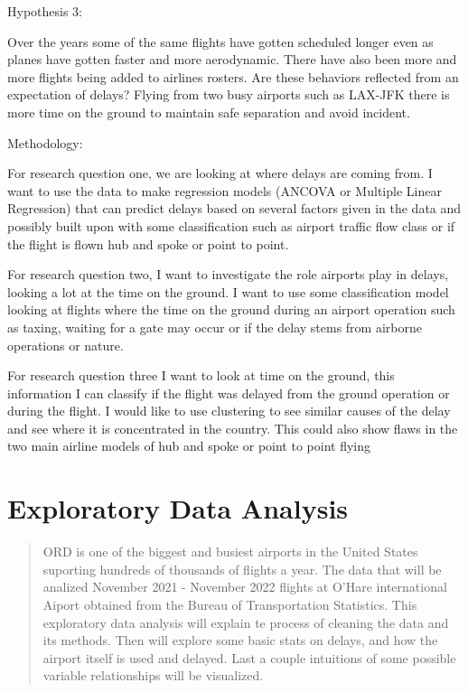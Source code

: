 \documentclass[a4paper,12pt]{article}
\begin{document}
Hypothesis 3:

Over the years some of the same flights have gotten scheduled longer even as planes have
gotten faster and more aerodynamic. There have also been more and more flights being added
to airlines rosters. Are these behaviors reflected from an expectation of delays? Flying from two
busy airports such as LAX-JFK there is more time on the ground to maintain safe separation and
avoid incident.

Methodology:

For research question one, we are looking at where delays are coming from. I want to
use the data to make regression models (ANCOVA or Multiple Linear Regression) that can
predict delays based on several factors given in the data and possibly built upon with some
classification such as airport traffic flow class or if the flight is flown hub and spoke or point to
point.

For research question two, I want to investigate the role airports play in delays, looking
a lot at the time on the ground. I want to use some classification model looking at flights where
the time on the ground during an airport operation such as taxing, waiting for a gate may occur
or if the delay stems from airborne operations or nature.

For research question three I want to look at time on the ground, this information I can
classify if the flight was delayed from the ground operation or during the flight. I would like to
use clustering to see similar causes of the delay and see where it is concentrated in the country.
This could also show flaws in the two main airline models of hub and spoke or point to point
flying

\section{Exploratory Data Analysis}

\begin{abstract}
    ORD is one of the biggest and busiest airports in the United States suporting hundreds of thousands of flights a year.
    The data that will be analized November 2021 - November 2022 flights at O'Hare international Aiport obtained from the Bureau of Transportation Statistics.   
    This exploratory data analysis will explain te process of cleaning the data and its methods. Then will explore some basic stats on delays, and how the airport itself is used 
    and delayed. Last a couple intuitions of some possible variable relationships will be visualized.
\end{abstract}
\end{document}
